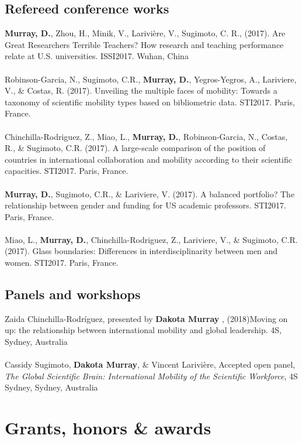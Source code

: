 \documentclass[10pt, a4paper]{article}
\newcommand{\years}[1]{\marginnote{\scriptsize #1}}
\begin{document}
\subsection*{Refereed conference works}
\years{2017}\textbf{Murray, D.}, Zhou, H., Minik, V., Larivière, V.,  Sugimoto, C. R., (2017). Are Great Researchers Terrible Teachers? How research and teaching performance relate at U.S. universities. ISSI2017. Wuhan, China\\
\\
\years{2017}Robinson-Garcia, N., Sugimoto, C.R., \textbf{Murray, D.}, Yegros-Yegros, A., Lariviere, V., \& Costas, R. (2017). Unveiling the multiple faces of mobility: Towards a taxonomy of scientific mobility types based on bibliometric data. STI2017. Paris, France.\\
\\
\years{2017}Chinchilla-Rodriguez, Z., Miao, L., \textbf{Murray, D.}, Robinson-Garcia, N., Costas, R., \& Sugimoto, C.R. (2017). A large-scale comparison of the position of countries in international collaboration and mobility according to their scientific capacities. STI2017. Paris, France.\\
\\
\years{2017}\textbf{Murray, D.}, Sugimoto, C.R., \& Lariviere, V. (2017). A balanced portfolio? The relationship between gender and funding for US academic professors. STI2017. Paris, France.\\
\\
\years{2017}Miao, L., \textbf{Murray, D.}, Chinchilla-Rodriguez, Z., Lariviere, V., \& Sugimoto, C.R. (2017). Glass boundaries: Differences in interdisciplinarity between men and women. STI2017. Paris, France.\\

\subsection*{Panels and workshops}
\years{2018}Zaida Chinchilla-Rodríguez, presented by \textbf{Dakota Murray }, (2018)Moving on up: the relationship between international mobility and global leadership. 4S, Sydney, Australia\\
\\
\years{2018}Cassidy Sugimoto, \textbf{Dakota Murray}, \&  Vincent Larivière, Accepted open panel, \emph{The Global Scientific Brain: International Mobility of the Scientific Workforce}, 4S Sydney, Sydney, Australia\\


\section*{Grants, honors \& awards}
\noindent
\end{document}
